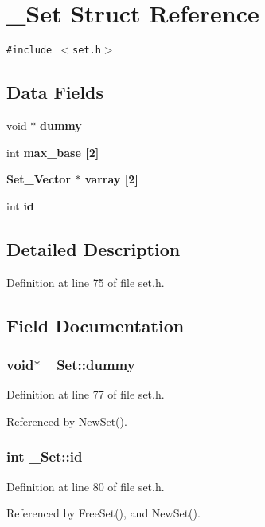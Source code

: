 \section{\_\-Set Struct Reference}
\label{struct__Set}
{\tt \#include $<$set.h$>$}

\subsection*{Data Fields}
\begin{CompactItemize}
\item 
void $\ast$ \bf{dummy}
\item 
int \bf{max\_\-base} [2]
\item 
\bf{Set\_\-Vector} $\ast$ \bf{varray} [2]
\item 
int \bf{id}
\end{CompactItemize}


\subsection{Detailed Description}




Definition at line 75 of file set.h.

\subsection{Field Documentation}
\subsubsection{\setlength{\rightskip}{0pt plus 5cm}void$\ast$ \bf{\_\-Set::dummy}}\label{struct__Set_5fa2c5a45ed2c96656a8fc20970c277c}




Definition at line 77 of file set.h.

Referenced by New\-Set().
\subsubsection{\setlength{\rightskip}{0pt plus 5cm}int \bf{\_\-Set::id}}\label{struct__Set_7104f220fdacbecf78bdb42e2e82a4b0}




Definition at line 80 of file set.h.

Referenced by Free\-Set(), and New\-Set().
